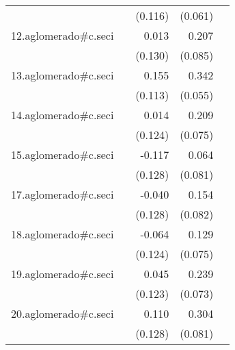 {\begin{longtable}{l*{4}{D{.}{.}{-1}}}
            &                     &     (0.116)         &     (0.061)         &                     \\
\addlinespace
12.aglomerado#c.seci&                     &       0.013         &       0.207\sym{*}  &                     \\
            &                     &     (0.130)         &     (0.085)         &                     \\
\addlinespace
13.aglomerado#c.seci&                     &       0.155         &       0.342\sym{***}&                     \\
            &                     &     (0.113)         &     (0.055)         &                     \\
\addlinespace
14.aglomerado#c.seci&                     &       0.014         &       0.209\sym{**} &                     \\
            &                     &     (0.124)         &     (0.075)         &                     \\
\addlinespace
15.aglomerado#c.seci&                     &      -0.117         &       0.064         &                     \\
            &                     &     (0.128)         &     (0.081)         &                     \\
\addlinespace
17.aglomerado#c.seci&                     &      -0.040         &       0.154         &                     \\
            &                     &     (0.128)         &     (0.082)         &                     \\
\addlinespace
18.aglomerado#c.seci&                     &      -0.064         &       0.129         &                     \\
            &                     &     (0.124)         &     (0.075)         &                     \\
\addlinespace
19.aglomerado#c.seci&                     &       0.045         &       0.239\sym{**} &                     \\
            &                     &     (0.123)         &     (0.073)         &                     \\
\addlinespace
20.aglomerado#c.seci&                     &       0.110         &       0.304\sym{***}&                     \\
            &                     &     (0.128)         &     (0.081)         &                     \\

\end{longtable}}
